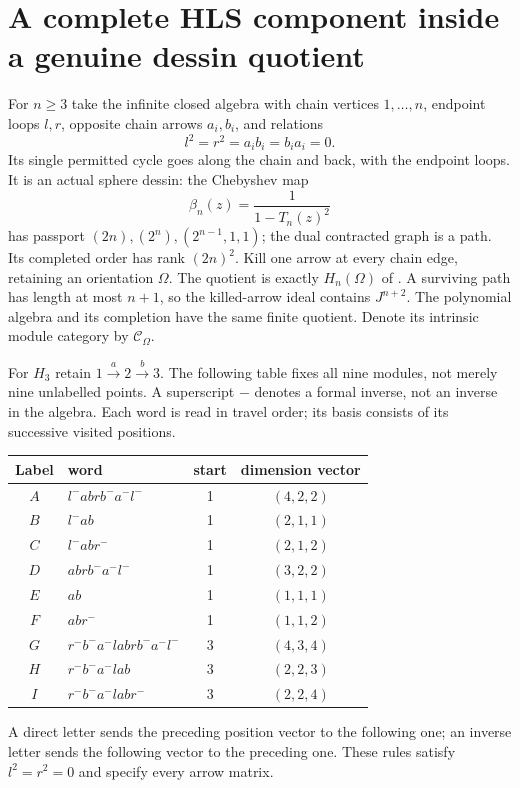 \documentclass[11pt,oneside,openany]{book}
\theoremstyle{definition}\newtheorem{definition}[theorem]{Definition}
\theoremstyle{remark}\newtheorem{remark}[theorem]{Remark}
\begin{document}
\section[An HLS component in a dessin quotient]{A complete HLS component inside a genuine dessin quotient}
For $n\ge3$ take the infinite closed algebra with chain vertices $1,\ldots,n$,
endpoint loops $l,r$, opposite chain arrows $a_i,b_i$, and relations
\[
 l^2=r^2=a_ib_i=b_ia_i=0.
\]
Its single permitted cycle goes along the chain and back, with the endpoint
loops. It is an actual sphere dessin: the Chebyshev map
\[
 \beta_n(z)=\frac{1}{1-T_n(z)^2}
\]
has passport $(2n),(2^n),(2^{n-1},1,1)$; the dual contracted graph is a path.
Its completed order has rank $(2n)^2$. Kill one arrow at every chain edge,
retaining an orientation $\Omega$. The quotient is exactly $H_n(\Omega)$ of
\cite{ARBHLS}. A surviving path has length at most $n+1$, so the killed-arrow
ideal contains $J^{n+2}$. The polynomial algebra and its completion have the
same finite quotient. Denote its intrinsic module category by $\mathcal C_\Omega$.

For $H_3$ retain $1\xrightarrow a2\xrightarrow b3$. The following table fixes
all nine modules, not merely nine unlabelled points. A superscript $-$ denotes
a formal inverse, not an inverse in the algebra. Each word is read in travel
order; its basis consists of its successive visited positions.
\begin{center}\small
\begin{tabular}{c l c c}
\toprule Label&word&start&dimension vector\\\midrule
$A$&$l^-abrb^-a^-l^-$&1&$(4,2,2)$\\
$B$&$l^-ab$&1&$(2,1,1)$\\
$C$&$l^-abr^-$&1&$(2,1,2)$\\
$D$&$abrb^-a^-l^-$&1&$(3,2,2)$\\
$E$&$ab$&1&$(1,1,1)$\\
$F$&$abr^-$&1&$(1,1,2)$\\
$G$&$r^-b^-a^-labrb^-a^-l^-$&3&$(4,3,4)$\\
$H$&$r^-b^-a^-lab$&3&$(2,2,3)$\\
$I$&$r^-b^-a^-labr^-$&3&$(2,2,4)$\\\bottomrule
\end{tabular}
\end{center}
A direct letter sends the preceding position vector to the following one;
an inverse letter sends the following vector to the preceding one. These rules
satisfy $l^2=r^2=0$ and specify every arrow matrix.
\end{document}
